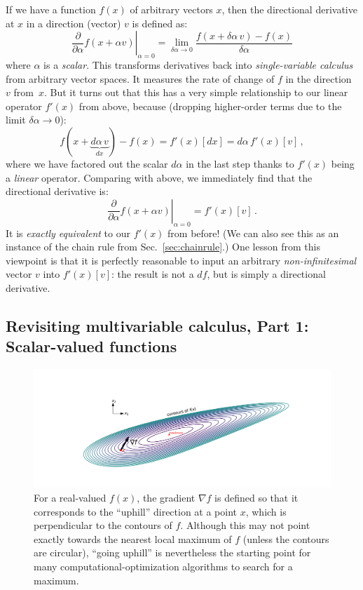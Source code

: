 If we have a function $f(x)$ of arbitrary vectors $x$, then the directional derivative at $x$ in a direction (vector) $v$ is defined as:
\begin{equation}
\left. \frac{\partial}{\partial \alpha} f(x+\alpha v) \right|_{\alpha = 0} = \lim_{\delta\alpha\to 0} \frac{f(x+\delta\alpha \, v) - f(x)}{\delta \alpha}
\end{equation}
where $\alpha$ is a \emph{scalar}.  This transforms derivatives back into \emph{single-variable calculus} from arbitrary vector spaces.  It measures the rate of change of $f$ in the direction~$v$ from~$x$.  But it turns out that this has a very simple relationship to our linear operator $f'(x)$ from above, because (dropping higher-order terms due to the limit $\delta\alpha \to 0$):
$$
f(x + \underbrace{d\alpha \, v}_{d x}) - f(x) = f'(x)[dx] = d\alpha \, f'(x)[v] \, ,
$$
where we have factored out the scalar $d\alpha$ in the last step thanks to $f'(x)$ being a \emph{linear} operator.  Comparing with above, we immediately find that the directional derivative is:
\begin{equation}
\boxed{ \left. \frac{\partial}{\partial \alpha} f(x+\alpha v) \right|_{\alpha = 0} = f'(x)[v]  }\, .
\end{equation}
It is \emph{exactly equivalent} to our $f'(x)$ from before!   (We can also see this as an instance of the chain rule from Sec.~\ref{sec:chainrule}.) One lesson from this viewpoint is that it is perfectly reasonable to input an arbitrary \emph{non-infinitesimal} vector $v$ into $f'(x)[v]$: the result is not a $df$, but is simply a directional derivative.

\subsection{Revisiting multivariable calculus, Part 1: Scalar-valued functions} \label{sec:multivarPart1}

\begin{figure}
    \centering
    \includegraphics[trim={5cm 2cm 5cm 2cm},clip,width=1.0\textwidth]{figures/gradient-uphill}
    \caption{For a real-valued $f(x)$, the gradient $\nabla f$ is defined so that it corresponds to the ``uphill'' direction at a point $x$, which is perpendicular to the contours of $f$.  Although this may not point exactly towards the nearest local maximum of $f$ (unless the contours are circular), ``going uphill'' is nevertheless the starting point for many computational-optimization algorithms to search for a maximum.}
    \label{fig:gradient-uphill}
\end{figure}

